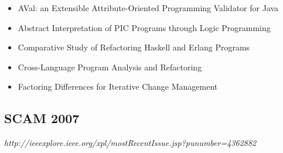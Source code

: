 {\begin{itemize}[itemsep=-1ex]
  \item AVal: an Extensible Attribute-Oriented Programming Validator for Java
  \item Abstract Interpretation of PIC Programs through Logic Programming {\color{blue} \checkmark}{\color{red} \texttimes}
  \item Comparative Study of Refactoring Haskell and Erlang Programs {\color{blue} \checkmark}{\color{red} \texttimes}
  \item Cross-Language Program Analysis and Refactoring {\color{blue} \checkmark}{\color{red} \texttimes}
  \item Factoring Differences for Iterative Change Management
\end{itemize}
}

\subsection{SCAM 2007}

{\small \em http://ieeexplore.ieee.org/xpl/mostRecentIssue.jsp?punumber=4362882}

